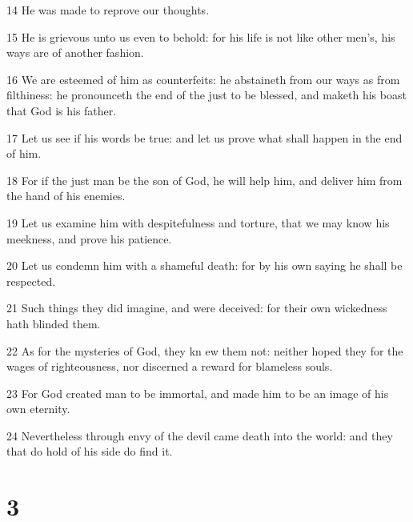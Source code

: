 \par 14 He was made to reprove our thoughts.
\par 15 He is grievous unto us even to behold: for his life is not like other men's, his ways are of another fashion.
\par 16 We are esteemed of him as counterfeits: he abstaineth from our ways as from filthiness: he pronounceth the end of the just to be blessed, and maketh his boast that God is his father.
\par 17 Let us see if his words be true: and let us prove what shall happen in the end of him.
\par 18 For if the just man be the son of God, he will help him, and deliver him from the hand of his enemies.
\par 19 Let us examine him with despitefulness and torture, that we may know his meekness, and prove his patience.
\par 20 Let us condemn him with a shameful death: for by his own saying he shall be respected.
\par 21 Such things they did imagine, and were deceived: for their own wickedness hath blinded them.
\par 22 As for the mysteries of God, they kn ew them not: neither hoped they for the wages of righteousness, nor discerned a reward for blameless souls.
\par 23 For God created man to be immortal, and made him to be an image of his own eternity.
\par 24 Nevertheless through envy of the devil came death into the world: and they that do hold of his side do find it.

\chapter{3}

